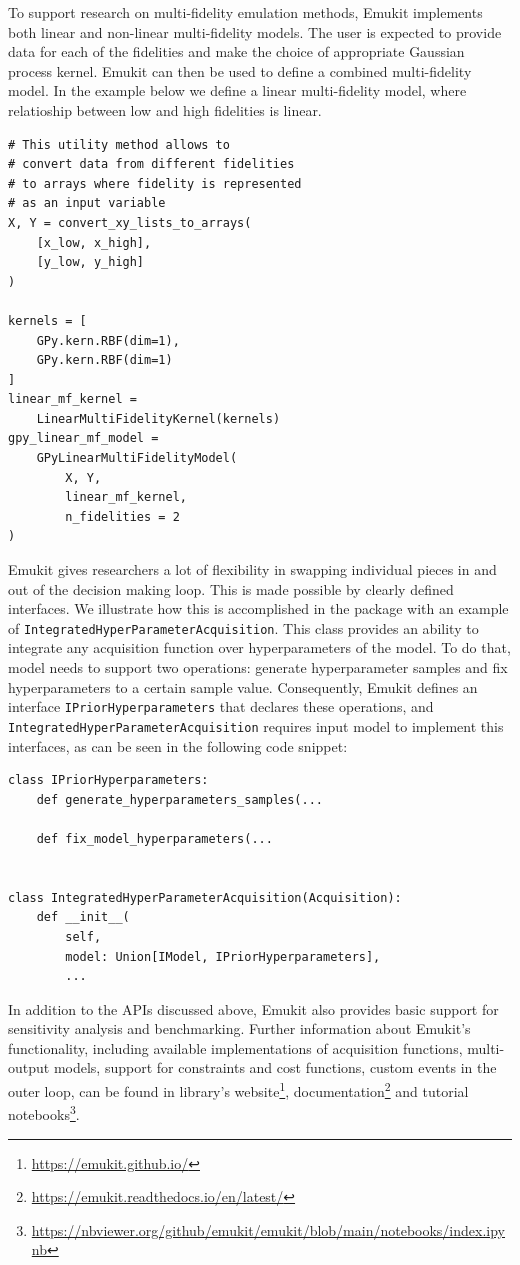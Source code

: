 To support research on multi-fidelity emulation methods, Emukit implements both linear and non-linear multi-fidelity models. The user is expected to provide data for each of the fidelities and make the choice of appropriate Gaussian process kernel. Emukit can then be used to define a combined multi-fidelity model. In the example below we define a linear multi-fidelity model, where relatioship between low and high fidelities is linear.

\begin{verbatim}
# This utility method allows to
# convert data from different fidelities
# to arrays where fidelity is represented
# as an input variable
X, Y = convert_xy_lists_to_arrays(
    [x_low, x_high],
    [y_low, y_high]
)

kernels = [
    GPy.kern.RBF(dim=1),
    GPy.kern.RBF(dim=1)
]
linear_mf_kernel =
    LinearMultiFidelityKernel(kernels)
gpy_linear_mf_model =
    GPyLinearMultiFidelityModel(
        X, Y,
        linear_mf_kernel,
        n_fidelities = 2
)
\end{verbatim}

Emukit gives researchers a lot of flexibility in swapping individual pieces in and out of the decision making loop. This is made possible by clearly defined interfaces. We illustrate how this is accomplished in the package with an example of \texttt{IntegratedHyperParameterAcquisition}. This class provides an ability to integrate any acquisition function over hyperparameters of the model. To do that, model needs to support two operations: generate hyperparameter samples and fix hyperparameters to a certain sample value. Consequently, Emukit defines an interface \texttt{IPriorHyperparameters} that declares these operations, and \texttt{IntegratedHyperParameterAcquisition} requires input model to implement this interfaces, as can be seen in the following code snippet:

\begin{verbatim}
class IPriorHyperparameters:
    def generate_hyperparameters_samples(...

    def fix_model_hyperparameters(...


class IntegratedHyperParameterAcquisition(Acquisition):
    def __init__(
        self,
        model: Union[IModel, IPriorHyperparameters],
        ...
\end{verbatim}

In addition to the APIs discussed above, Emukit also provides basic support for sensitivity analysis and benchmarking. Further information about Emukit's functionality, including available implementations of acquisition functions, multi-output models, support for constraints and cost functions, custom events in the outer loop, can be found in library's website\footnote{\url{https://emukit.github.io/}}, documentation\footnote{\url{https://emukit.readthedocs.io/en/latest/}} and tutorial notebooks\footnote{\url{https://nbviewer.org/github/emukit/emukit/blob/main/notebooks/index.ipynb}}. 

